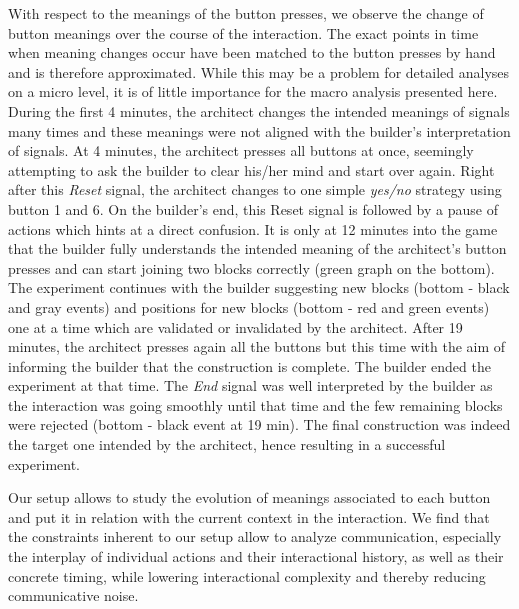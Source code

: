 With respect to the meanings of the button presses, we observe the change of button meanings over the course of the interaction. The exact points in time when meaning changes occur have been matched to the button presses by hand and is therefore approximated. While this may be a problem for detailed analyses on a micro level, it is of little importance for the macro analysis presented here. During the first 4 minutes, the architect changes the intended meanings of signals many times and these meanings were not aligned with the builder's interpretation of signals. At 4 minutes, the architect presses all buttons at once, seemingly attempting to ask the builder to clear his/her mind and start over again. Right after this \emph{Reset} signal, the architect changes to one simple \emph{yes/no} strategy using button 1 and 6. On the builder's end, this Reset signal is followed by a pause of actions which hints at a direct confusion. It is only at 12 minutes into the game that the builder fully understands the intended meaning of the architect's button presses and can start joining two blocks correctly (green graph on the bottom). The experiment continues with the builder suggesting new blocks (bottom - black and gray events) and positions for new blocks (bottom - red and green events) one at a time which are validated or invalidated by the architect. After 19 minutes, the architect presses again all the buttons but this time with the aim of informing the builder that the construction is complete. The builder ended the experiment at that time. The \emph{End} signal was well interpreted by the builder as the interaction was going smoothly until that time and the few remaining blocks were rejected (bottom - black event at 19 min). The final construction was indeed the target one intended by the architect, hence resulting in a successful experiment.

Our setup allows to study the evolution of meanings associated to each button and put it in relation with the current context in the interaction.
We find that the constraints inherent to our setup allow to analyze communication, especially the interplay of individual actions and their interactional history, as well as their concrete timing, while lowering interactional complexity and thereby reducing communicative noise.

